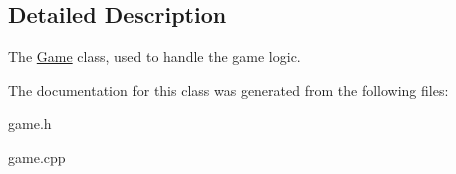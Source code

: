 \subsection{Detailed Description}
The \hyperlink{classGame}{Game} class, used to handle the game logic. 

The documentation for this class was generated from the following files\+:\begin{DoxyCompactItemize}
\item 
game.\+h\item 
game.\+cpp\end{DoxyCompactItemize}
